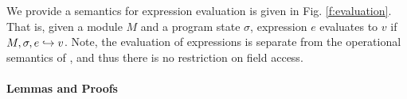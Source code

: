 
We provide a semantics for expression evaluation is given in Fig. \ref{f:evaluation}. 
That is, given a module $M$ and a program state $\sigma$, expression $e$ evaluates to $v$
if $M, \sigma, e \hookrightarrow v$. Note, the evaluation of expressions is separate from the operational
semantics of \LangOO, and thus there is no restriction on field access.

{
\paragraph{Lemmas and Proofs}
}

